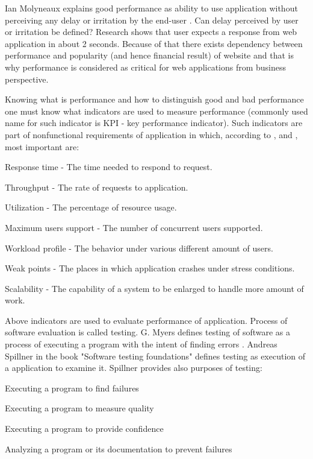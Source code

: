\documentclass[10pt,a4paper]{article}
\let\tempone\itemize
\let\temptwo\enditemize
\renewenvironment{itemize}{\tempone\addtolength{\itemsep}{-0.4\baselineskip}}{\temptwo}
\begin{document}
Ian Molyneaux explains good performance as ability to use application without perceiving any delay or irritation by the end-user \cite{artperformance}. Can delay perceived by user or irritation be defined? Research \cite{howlong} shows that user expects a response from web application in about 2 seconds. Because of that there exists dependency between performance and popularity (and hence financial result) of website and that is why performance is  considered as critical for web applications from business perspective\cite{architectingperformance}. 

Knowing what is performance and how to distinguish good and bad performance one must know what indicators are used to measure performance (commonly used name for such indicator is KPI - key performance indicator). Such indicators are part of nonfunctional requirements of application in which, according to \cite{artperformance}, \cite{analysisofpet} and \cite{petmethodsandtools},  most important are:  
\begin{itemize}
\item Response time - The time needed to respond to request.
\item Throughput - The rate of requests to application.
\item Utilization - The percentage of resource usage.
\item Maximum users support - The number of concurrent users supported.
\item Workload profile - The behavior under various different amount of users.
\item Weak points - The places in which application crashes under stress conditions.
\item Scalability - The capability of a system to be enlarged to handle more amount of work.
\end{itemize}

Above indicators are used to evaluate performance of application. Process of software evaluation is called testing. G. Myers defines testing of software as a process of executing a program with the intent of finding errors \cite{arttest}. Andreas Spillner in the book "Software testing foundations" \cite{testfoundations} defines testing as execution of a application to examine it. Spillner provides also purposes of testing: 
\begin{itemize}
\item Executing a program to find failures
\item Executing a program to measure quality
\item Executing a program to provide confidence 
\item Analyzing a program or its documentation to prevent failures
\end{itemize}
\end{document}
